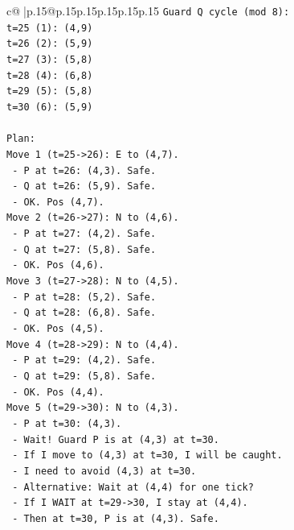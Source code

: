 \documentclass{article}
\begin{document}
{\begin{supertabular}{c@{$\;$}|p{.15\linewidth}@{}p{.15\linewidth}p{.15\linewidth}p{.15\linewidth}p{.15\linewidth}p{.15\linewidth}}
{{{\texttt{Guard Q cycle (mod 8):} \\
\texttt{t=25 (1): (4,9)} \\
\texttt{t=26 (2): (5,9)} \\
\texttt{t=27 (3): (5,8)} \\
\texttt{t=28 (4): (6,8)} \\
\texttt{t=29 (5): (5,8)} \\
\texttt{t=30 (6): (5,9)} \\
\\ 
\texttt{Plan:} \\
\texttt{Move 1 (t=25{-}>26): E to (4,7).} \\
\texttt{  {-} P at t=26: (4,3). Safe.} \\
\texttt{  {-} Q at t=26: (5,9). Safe.} \\
\texttt{  {-} OK. Pos (4,7).} \\
\texttt{Move 2 (t=26{-}>27): N to (4,6).} \\
\texttt{  {-} P at t=27: (4,2). Safe.} \\
\texttt{  {-} Q at t=27: (5,8). Safe.} \\
\texttt{  {-} OK. Pos (4,6).} \\
\texttt{Move 3 (t=27{-}>28): N to (4,5).} \\
\texttt{  {-} P at t=28: (5,2). Safe.} \\
\texttt{  {-} Q at t=28: (6,8). Safe.} \\
\texttt{  {-} OK. Pos (4,5).} \\
\texttt{Move 4 (t=28{-}>29): N to (4,4).} \\
\texttt{  {-} P at t=29: (4,2). Safe.} \\
\texttt{  {-} Q at t=29: (5,8). Safe.} \\
\texttt{  {-} OK. Pos (4,4).} \\
\texttt{Move 5 (t=29{-}>30): N to (4,3).} \\
\texttt{  {-} P at t=30: (4,3).} \\
\texttt{  {-} Wait! Guard P is at (4,3) at t=30.} \\
\texttt{  {-} If I move to (4,3) at t=30, I will be caught.} \\
\texttt{  {-} I need to avoid (4,3) at t=30.} \\
\texttt{  {-} Alternative: Wait at (4,4) for one tick?} \\
\texttt{  {-} If I WAIT at t=29{-}>30, I stay at (4,4).} \\
\texttt{  {-} Then at t=30, P is at (4,3). Safe.} \\
}}}
\end{supertabular}}
\end{document}
